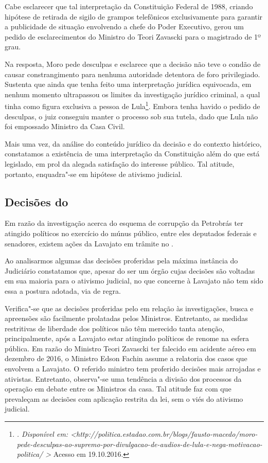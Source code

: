 Cabe esclarecer que tal interpretação da Constituição Federal de 1988,
criando hipótese de retirada de sigilo de grampos telefônicos
exclusivamente para garantir a publicidade de situação envolvendo a
chefe do Poder Executivo, gerou um pedido de esclarecimentos do Ministro
do  Teori Zavascki para o magistrado de 1º grau.

Na resposta, Moro pede desculpas e esclarece que a decisão não teve o
condão de causar constrangimento para nenhuma autoridade detentora de
foro privilegiado. Sustenta que ainda que tenha feito uma interpretação
jurídica equivocada, em nenhum momento ultrapassou os limites da
investigação jurídico criminal, a qual tinha como figura exclusiva a
pessoa de Lula\footnote{\emph{. Disponível em:
  \textless{}http://politica.estadao.com.br/blogs/fausto-macedo/moro-pede-desculpas-ao-supremo-por-divulgacao-de-audios-de-lula-e-nega-motivacao-politica/
  \textgreater{}}
  Acesso em 19.10.2016.}. Embora tenha havido o pedido de desculpas, o
juiz conseguiu manter o processo sob sua tutela, dado que Lula não foi
empossado Ministro da Casa Civil.

Mais uma vez, da análise do conteúdo jurídico da decisão e do contexto
histórico, constatamos a existência de uma interpretação da Constituição
além do que está legislado, em prol da alegada satisfação do interesse
público. Tal atitude, portanto, enquadra"-se em hipótese de ativismo
judicial.

\subsection{Decisões do }

Em razão da investigação acerca do esquema de corrupção da Petrobrás ter
atingido políticos no exercício do múnus público, entre eles deputados
federais e senadores, existem ações da Lavajato em trâmite no .

Ao analisarmos algumas das decisões proferidas pela máxima instância do
Judiciário constatamos que, apesar do  ser um órgão cujas decisões
são voltadas em sua maioria para o ativismo judicial, no que concerne à
Lavajato não tem sido essa a postura adotada, via de regra.

Verifica"-se que as decisões proferidas pelo  em relação às
investigações, busca e apreensões são facilmente prolatadas pelos
Ministros. Entretanto, as medidas restritivas de liberdade dos políticos
não têm merecido tanta atenção, principalmente, após a Lavajato estar
atingindo políticos de renome na esfera pública. Em razão do Ministro
Teori Zavascki ter falecido em acidente aéreo em dezembro de 2016, o
Ministro Edson Fachin assume a relatoria dos casos que envolvem a
Lavajato. O referido ministro tem proferido decisões mais arrojadas e
ativistas. Entretanto, observa"-se uma tendência a divisão dos processos
da operação em debate entre os Ministros da casa. Tal atitude faz com
que prevaleçam as decisões com aplicação restrita da lei, sem o viés do
ativismo judicial.

